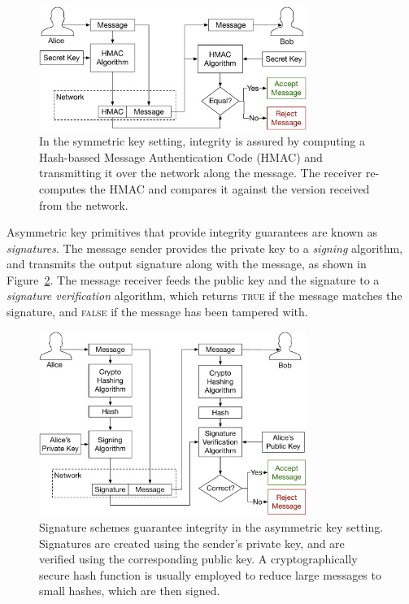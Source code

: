 \begin{figure}[hbt]
  \centering
  \includegraphics[width=87mm]{figures/symmetric_hmac.pdf}
  \caption{
    In the symmetric key setting, integrity is assured by computing a
    Hash-bassed Message Authentication Code (HMAC) and transmitting it over the
    network along the message. The receiver re-computes the HMAC and compares
    it against the version received from the network.
  }
  \label{fig:symmetric_hmac}
\end{figure}

Asymmetric key primitives that provide integrity guarantees are known as
\textit{signatures}. The message sender provides the private key to a
\textit{signing} algorithm, and transmits the output signature along with the
message, as shown in Figure~\ref{fig:asymmetric_signing}. The message receiver
feeds the public key and the signature to a \textit{signature verification}
algorithm, which returns \textsc{true} if the message matches the signature,
and \textsc{false} if the message has been tampered with.

\begin{figure}[hbt]
  \centering
  \includegraphics[width=87mm]{figures/asymmetric_signing.pdf}
  \caption{
    Signature schemes guarantee integrity in the asymmetric key setting.
    Signatures are created using the sender's private key, and are verified
    using the corresponding public key. A cryptographically secure hash
    function is usually employed to reduce large messages to small hashes,
    which are then signed.
  }
  \label{fig:asymmetric_signing}
\end{figure}


